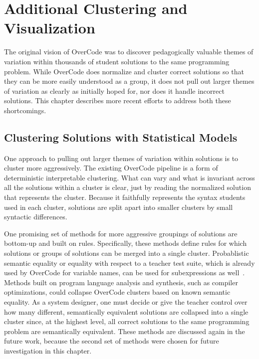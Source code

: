 \chapter{Additional Clustering and Visualization}\label{chapter:grovercode}

The original vision of OverCode was to discover pedagogically valuable themes of variation within thousands of student solutions to the same programming problem. While OverCode does normalize and cluster correct solutions so that they can be more easily understood as a group, it does not pull out larger themes of variation as clearly as initially hoped for, nor does it handle incorrect solutions. This chapter describes more recent efforts to address both these shortcomings.

\section{Clustering Solutions with Statistical Models}\label{sec:latent}

One approach to pulling out larger themes of variation within solutions is to cluster more aggressively. The existing OverCode pipeline is a form of deterministic interpretable clustering. What can vary and what is invariant across all the solutions within a cluster is clear, just by reading the normalized solution that represents the cluster. Because it faithfully represents the syntax students used in each cluster, solutions are split apart into smaller clusters by small syntactic differences. 

One promising set of methods for more aggressive groupings of solutions are bottom-up and built on rules. Specifically, these methods define rules for which solutions or groups of solutions can be merged into a single cluster. Probablistic semantic equality or equality with respect to a teacher test suite, which is already used by OverCode for variable names, can be used for subexpressions as well~\cite{}. Methods built on program language analysis and synthesis, such as compiler optimizations, could collapse OverCode clusters based on known semantic equality. As a system designer, one must decide or give the teacher control over how many different, semantically equivalent solutions are collapsed into a single cluster since, at the highest level, all correct solutions to the same programming problem are semantically equivalent. These methods are discussed again in the future work, because the second set of methods were chosen for future investigation in this chapter.

